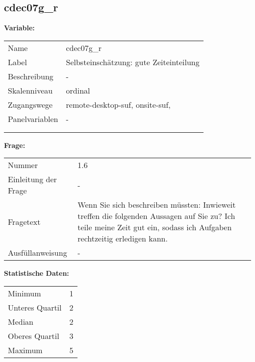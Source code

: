 	
	
	\subsection{cdec07g\_r}
	\label{subSection:cdec07g_r}

	\noindent\textbf{Variable:}\\
		\begin{tabular}{lL{11.3cm}}
			\label{tableVariable:cdec07g_r}
			Name & cdec07g\_r \\
			Label & Selbsteinschätzung: gute Zeiteinteilung \\
			Beschreibung & - \\
			Skalenniveau & ordinal \\
			Zugangswege &
				remote-desktop-suf,
				onsite-suf,
 \\
			Panelvariablen & -
			 \\
			 \\
 \\
		\end{tabular}

		\vspace*{1 cm}
		\noindent\textbf{Frage:}\\
		\begin{tabular}{lL{11.3cm}}
			\label{tableQuestion:cdec07g_r}
			Nummer & 1.6 \\
			Einleitung der Frage & - \\
			Fragetext & Wenn Sie sich beschreiben müssten: Inwieweit treffen die folgenden Aussagen auf Sie zu?
Ich teile meine Zeit gut ein, sodass ich Aufgaben rechtzeitig erledigen kann. \\
			Ausfüllanweisung & - \\
		\end{tabular}


		\vspace*{1 cm}
		\noindent\textbf{Statistische Daten:}\\
			\begin{tabular}{ll}
				\label{tableStatistics:cdec07g_r}
					Minimum & 1 \\
					Unteres Quartil & 2 \\
					Median & 2 \\
					Oberes Quartil & 3 \\
					Maximum & 5 \\
			\end{tabular}




